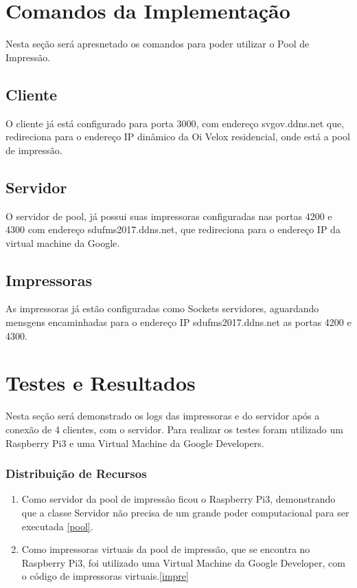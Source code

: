 \documentclass[12pt]{article}
\begin{document}
\section{Comandos da Implementação }
	Nesta seção será apresnetado os comandos para poder utilizar o Pool de Impressão. 
 

\subsection{Cliente}
O cliente já está configurado para porta 3000, com endereço svgov.ddns.net que, redireciona para o endereço IP dinâmico da Oi Velox residencial, onde está a pool de impressão. 
\subsection{Servidor}
O servidor de pool, já possui suas impressoras configuradas nas portas 4200 e 4300 com endereço sdufms2017.ddns.net, que redireciona para o endereço IP da virtual machine da Google. 
\subsection{Impressoras}
As impressoras já estão configuradas como Sockets servidores, aguardando mensgens encaminhadas para o endereço IP sdufms2017.ddns.net as portas 4200 e 4300.

 
 \section{Testes e Resultados }
 Nesta seção será demonstrado os logs das impressoras e do servidor após a conexão de 4 clientes, com o servidor.
 Para realizar os testes foram utilizado um Raspberry Pi3 e uma Virtual Machine da Google Developers.
 \subsubsection{Distribuição de Recursos}
 \begin{enumerate}
 	
 	\item Como servidor da pool de impressão ficou o Raspberry Pi3, demonstrando que a classe Servidor não precisa de um grande poder computacional para ser executada \ref{pool}.
 	\item Como impressoras virtuais da pool de impressão, que se encontra no Raspberry Pi3, foi utilizado uma Virtual Machine da Google Developer, com o código de impressoras virtuais.\ref{impre}
 \end{enumerate}
\end{document}
